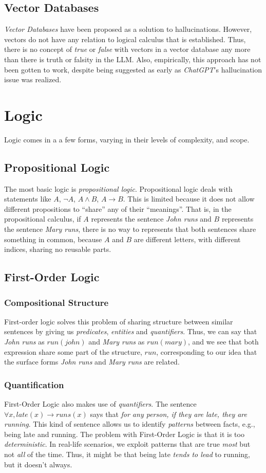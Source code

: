 \documentclass[12pt]{article}
\begin{document}
\subsection{Vector Databases}
{\em Vector Databases} have been proposed as a solution to hallucinations.
However, vectors do not have any relation to logical calculus that is established.
Thus, there is no concept of {\em true} or {\em false} with vectors in a vector database any more than there is truth or falsity in the LLM.
Also, empirically, this approach has not been gotten to work, despite being suggested as early as {\em ChatGPT}'s hallucination issue was realized.
\section{Logic}
Logic comes in a a few forms, varying in their levels of complexity, and scope.

\subsection{Propositional Logic}
The most basic logic is {\em propositional logic}.
Propositional logic deals with statements like $A$, $\neg A$, $A \wedge B$, $A \rightarrow B$.
This is limited because it does not allow different propositions to ``share'' any of their ``meanings''.
That is, in the propositional calculus, if $A$ represents the sentence {\em John runs} and $B$ represents
the sentence {\em Mary runs}, there is no way to represents that both sentences share something
in common, because $A$ and $B$ are different letters, with different indices, sharing no reusable parts.

\subsection{First-Order Logic}
\subsubsection{Compositional Structure}
First-order logic solves this problem of sharing structure between similar sentences by
giving us {\em predicates}, {\em entities} and {\em quantifiers}.
Thus, we can say that {\em John runs} as $run(john)$ and {\em Mary runs} as $run(mary)$,
and we see that both expression share some part of the structure, $run$, corresponding
to our idea that the surface forms {\em John runs} and {\em Mary runs} are related.
\subsubsection{Quantification}
First-Order Logic also makes use of {\em quantifiers}.
The sentence $\forall x, late(x)\rightarrow runs(x)$ says that {\em for any person, if they are late, they are running}.
This kind of sentence allows us to identify {\em patterns} between facts, e.g., being late and running.
The problem with First-Order Logic is that it is too {\em deterministic}.
In real-life scenarios, we exploit patterns that are true {\em most} but not {\em all} of the time.
Thus, it might be that being late {\em tends to lead} to running, but it doesn't always.
\end{document}
